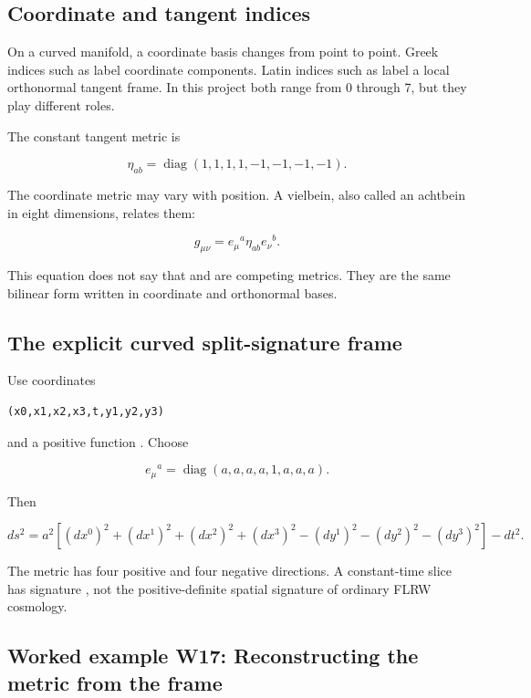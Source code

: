 \documentclass[11pt]{article}
\begin{document}
\subsection{Coordinate and tangent indices}

On a curved manifold, a coordinate basis changes from point to point. Greek indices such as \texttt{} label coordinate components. Latin indices such as \texttt{} label a local orthonormal tangent frame. In this project both range from 0 through 7, but they play different roles.

The constant tangent metric is

\[
\eta_{ab}=\operatorname{diag}(1,1,1,1,-1,-1,-1,-1).
\]

The coordinate metric \texttt{} may vary with position. A vielbein, also called an achtbein in eight dimensions, relates them:

\[
g_{\mu\nu}=e_\mu{}^a\eta_{ab}e_\nu{}^b.
\]

This equation does not say that \texttt{} and \texttt{} are competing metrics. They are the same bilinear form written in coordinate and orthonormal bases.

\subsection{The explicit curved split-signature frame}

Use coordinates

\begin{Verbatim}[fontsize=\small]
(x0,x1,x2,x3,t,y1,y2,y3)
\end{Verbatim}

and a positive function \texttt{}. Choose

\[
e_\mu{}^a=\operatorname{diag}(a,a,a,a,1,a,a,a).
\]

Then

\[
ds^2=a^2\left[(dx^0)^2+(dx^1)^2+(dx^2)^2+(dx^3)^2
-(dy^1)^2-(dy^2)^2-(dy^3)^2\right]-dt^2.
\]

The metric has four positive and four negative directions. A constant-time slice has signature \texttt{}, not the positive-definite spatial signature of ordinary FLRW cosmology.

\subsection{Worked example W17: Reconstructing the metric from the frame}
\end{document}

